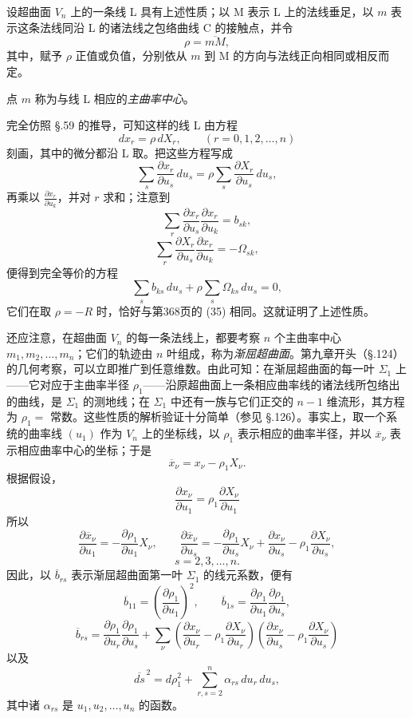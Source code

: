 设超曲面 $V_n$ 上的一条线 L 具有上述性质；以 M 表示 L 上的法线垂足，以 $m$ 表示这条法线同沿 L 的诸法线之包络曲线 C 的接触点，并令
\[
\rho=\overline{mM},
\]
其中，赋予 $\rho$ 正值或负值，分别依从 $m$ 到 M 的方向与法线正向相同或相反而定。

点 $m$ 称为与线 L 相应的\emph{主曲率中心}。

完全仿照 \S.59 的推导，可知这样的线 L 由方程
\[
dx_r=\rho\,dX_r,\qquad (r=0,1,2,\ldots,n)
\]
刻画，其中的微分都沿 L 取。把这些方程写成
\[
\sum_s\frac{\partial x_r}{\partial u_s}\,du_s
=\rho\sum_s\frac{\partial X_r}{\partial u_s}\,du_s,
\]
再乘以 $\frac{\partial x_r}{\partial u_k}$，并对 $r$ 求和；注意到
\[
\sum_r\frac{\partial x_r}{\partial u_s}\frac{\partial x_r}{\partial u_k}=b_{sk},
\]
\[
\sum_r\frac{\partial X_r}{\partial u_s}\frac{\partial x_r}{\partial u_k}=-\Omega_{sk},
\]
便得到完全等价的方程
\[
\sum_s b_{ks}\,du_s+\rho\sum_s\Omega_{ks}\,du_s=0,
\]
它们在取 $\rho=-R$ 时，恰好与第368页的 (35) 相同。这就证明了上述性质。

还应注意，在超曲面 $V_n$ 的每一条法线上，都要考察 $n$ 个主曲率中心 $m_1,m_2,\ldots,m_n$；它们的轨迹由 $n$ 叶组成，称为\emph{渐屈超曲面}。第九章开头（\S.124）的几何考察，可以立即推广到任意维数。由此可知：在渐屈超曲面的每一叶 $\Sigma_1$ 上——它对应于主曲率半径 $\rho_1$——沿原超曲面上一条相应曲率线的诸法线所包络出的曲线，是 $\Sigma_1$ 的测地线；在 $\Sigma_1$ 中还有一族与它们正交的 $n-1$ 维流形，其方程为 $\rho_1=$ 常数。这些性质的解析验证十分简单（参见 \S.126）。事实上，取一个系统的曲率线 $(u_1)$ 作为 $V_n$ 上的坐标线，以 $\rho_1$ 表示相应的曲率半径，并以 $\overline{x}_\nu$ 表示相应曲率中心的坐标；于是
\[
\overline{x}_\nu=x_\nu-\rho_1X_\nu.
\]
根据假设，
\[
\frac{\partial x_\nu}{\partial u_1}=\rho_1\frac{\partial X_\nu}{\partial u_1}
\]
所以
\[
\frac{\partial\overline{x}_\nu}{\partial u_1}
=-\frac{\partial\rho_1}{\partial u_1}X_\nu,\qquad
\frac{\partial\overline{x}_\nu}{\partial u_s}
=-\frac{\partial\rho_1}{\partial u_s}X_\nu+
\frac{\partial x_\nu}{\partial u_s}
-\rho_1\frac{\partial X_\nu}{\partial u_s},
\]
\[
s=2,3,\ldots,n.
\]
因此，以 $\overline{b}_{rs}$ 表示渐屈超曲面第一叶 $\Sigma_1$ 的线元系数，便有
\[
\overline{b}_{11}=\left(\frac{\partial\rho_1}{\partial u_1}\right)^2,\qquad
\overline{b}_{1s}=\frac{\partial\rho_1}{\partial u_1}\frac{\partial\rho_1}{\partial u_s},
\]
\[
\overline{b}_{rs}=\frac{\partial\rho_1}{\partial u_r}\frac{\partial\rho_1}{\partial u_s}
+\sum_\nu\left(\frac{\partial x_\nu}{\partial u_r}-\rho_1\frac{\partial X_\nu}{\partial u_r}\right)
\left(\frac{\partial x_\nu}{\partial u_s}-\rho_1\frac{\partial X_\nu}{\partial u_s}\right)
\]
以及
\[
\overline{ds}^{\,2}=d\rho_1^2+\sum_{r,s=2}^{n}\alpha_{rs}\,du_r\,du_s,
\]
其中诸 $\alpha_{rs}$ 是 $u_1,u_2,\ldots,u_n$ 的函数。

